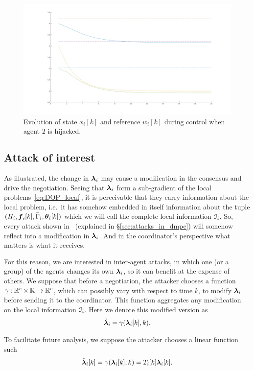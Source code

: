\documentclass[../main.tex]{subfiles}
\begin{document}
\begin{figure}[h]
  \centering
  \includegraphics[width=.5\textwidth]{../img/example_liar_state.png}
  \caption{Evolution of state $x_{i}[k]$ and reference $w_{i}[k]$ during control when agent $2$ is hijacked. }\label{fig:example_liar_state}
\end{figure}

\subsection{Attack of interest}\label{sec:attack-interest}

As illustrated, the change in $\boldsymbol{\lambda}_i$ may cause a modification in the consensus and drive the negotiation.
Seeing that $\boldsymbol{\lambda}_i$ form a sub-gradient of the local problems~\eqref{eq:DOP_local}, it is perceivable that they carry information about the local problem, i.e.\ it has somehow embedded in itself information about the tuple $(H_{i},\vec{f}_{i}[k],\bar{\Gamma}_{i},\thetaik)$ which we will call the complete local information $\mathcal{I}_{i}$.
So, every attack shown in~\cite{VelardeEtAl2018} (explained in \S\ref{sec:attacks_in_dmpc}) will somehow reflect into a modification in $\boldsymbol{\lambda}_i$.
And in the coordinator's perspective what matters is what it receives.

For this reason, we are interested in inter-agent \fdi{} attacks, in which one (or a group) of the agents changes its own $\boldsymbol{\lambda}_i$, so it can benefit at the expense of others.
We suppose that before a negotiation, the attacker chooses a function ${\gamma:\mathbb{R}^{c}\times\mathbb{R}\to \mathbb{R}^{c}}$, which can possibly vary with respect to time $k$, to modify $\boldsymbol{\lambda}_i$ before sending it to the coordinator.
This function aggregates any modification on the local information $\mathcal{I}_{i}$.
Here we denote this modified version as
\begin{equation}
  \tilde{\vec{\lambda}}_{i}=\gamma(\lambdaik,k).
\end{equation}

To facilitate future analysis, we suppose the attacker chooses a linear function such
\begin{equation}
  \label{eq:linear_attack}
  \tilde{\vec{\lambda}}_{i}[k]=\gamma(\lambdaik,k)=T_{i}[k]\lambdaik.
\end{equation}
\end{document}
